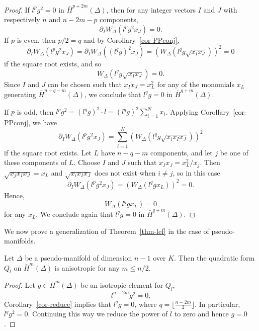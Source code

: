 \begin{proof}
If $l^p g^2 = 0$ in $\bar{H}^{p+2m}(\Delta)$, then for any integer vectors $I$ and $J$ with respectively $n$ and $n-2m-p$ components,
\[ \partial_I W_\Delta(l^p g^2 x_J) = 0. \]
If $p$ is even, then $p/2 = q$ and by Corollary~\ref{cor-PPconj},
\[ \partial_I W_\Delta(l^p g^2 x_J) = \partial_I W_\Delta((l^q g)^2 x_J) = (W_\Delta( l^q g \sqrt{x_I x_J}))^2 = 0 \]
if the square root exists, and so
\[ W_\Delta( l^q g \sqrt{x_I x_J}) = 0. \]
Since $I$ and $J$ can be chosen such that $x_I x_J = x_L^2$  for any of the monomials $x_L$ generating $\bar{H}^{n-q-m}(\Delta)$,  we conclude that $l^q g = 0$ in $\bar{H}^{q+m}(\Delta)$.

If $p$ is odd, then $l^p g^2 = (l^q g)^2 \cdot l = (l^q g)^2 \sum_{i=1}^N x_i$. Applying Corollary~\ref{cor-PPconj}, we have
\[ \partial_I W_\Delta(l^p g^2 x_J) = \sum_{i=1}^N  (W_\Delta(l^q g \sqrt{ x_i x_I x_J} ))^2 \]
if the square root exists. Let $L$ have $n-q-m$ components, and let $j$ be one of these components of $L$. Choose $I$ and $J$ such that $x_I x_J = x_L^2/x_j$. Then $\sqrt{ x_j x_I x_J}  = x_L$ and $\sqrt{ x_i x_I x_J}$ does not exist when $i \neq j$, so in this case
\[ \partial_I W_\Delta(l^p g^2 x_J)
 =   (W_\Delta(l^q g x_L))^2 = 0. \]
Hence,
\[ W_\Delta(l^q g x_L) = 0 \]
for any $x_L$. We conclude again that $l^q g = 0$ in $\bar{H}^{q+m}(\Delta)$.
\end{proof}

We now prove a generalization of Theorem~\ref{thm-lef} in the case of pseudo-manifolds.

\begin{theorem}
Let $\Delta$ be a pseudo-manifold of dimension $n-1$ over $K$. Then the quadratic form $Q_l$ on $\bar{H}^m(\Delta)$ is anisotropic  for any $m\leq n/2$.
\end{theorem}

\begin{proof}
Let $g \in \bar{H}^m(\Delta)$ be an isotropic element for $Q_l$,
\[ l^{n-2m} g^2 = 0.\]
Corollary~\ref{cor-reduce} implies that $l^q g = 0$, where $q = \lfloor \frac{n-2m}{2}\rfloor$. In particular, $l^q g^2 = 0$. Continuing this way we reduce the power of $l$ to zero and hence $g=0$.
\end{proof}
